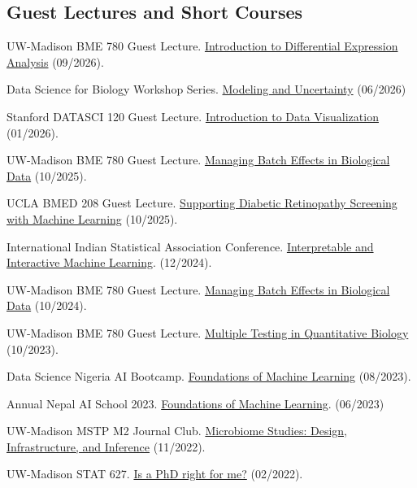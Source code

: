 \documentclass[letterpaper]{article}
\renewenvironment{itemize}{
  \begin{list}{}{
    \setlength{\leftmargin}{1.5em}
  }
}{
  \end{list}
}
\begin{document}
\subsection*{Guest Lectures and Short Courses}
\begin{itemize}

\item UW-Madison BME 780 Guest Lecture. \href{https://krisrs1128.github.io/talks/2026/20260923/20260923.html}{Introduction to Differential Expression Analysis} (09/2026).
\item Data Science for Biology Workshop Series. \href{https://krisrs1128.github.io/durban_workshop/notes.html}{Modeling and Uncertainty} (06/2026)
\item Stanford DATASCI 120 Guest Lecture. \href{https://go.wisc.edu/5fia0y}{Introduction to Data Visualization} (01/2026).
\item UW-Madison BME 780 Guest Lecture. \href{https://krisrs1128.github.io/talks/2025/20251008/20251008.html#1}{Managing Batch Effects in Biological Data} (10/2025).
\item UCLA BMED 208 Guest Lecture. \href{https://go.wisc.edu/32rv90}{Supporting Diabetic Retinopathy Screening with Machine Learning} (10/2025).
\item International Indian Statistical Association Conference. \href{https://docs.google.com/document/u/1/d/1IIu7lEmvBSqQhB5hQQrmus7JN-g-rCS6_HNcNcphlq8/edit?tab=t.0}{Interpretable and Interactive Machine Learning}. (12/2024).
\item UW-Madison BME 780 Guest Lecture. \href{https://krisrs1128.github.io/talks/2024/20241023/20241023.html#1}{Managing Batch Effects in Biological Data} (10/2024).
\item UW-Madison BME 780 Guest Lecture. \href{https://krisrs1128.github.io/talks/2023/20231010/20231010.html}{Multiple Testing in Quantitative Biology} (10/2023).
\item Data Science Nigeria AI Bootcamp. \href{http://krisrs1128.github.io/dsn_foundations_2023}{Foundations of Machine Learning} (08/2023).
\item Annual Nepal AI School 2023. \href{http://krisrs1128.github.io/naamii_summer_2023}{Foundations of Machine Learning}. (06/2023)
\item UW-Madison MSTP M2 Journal Club. \href{https://krisrs1128.github.io/talks/2022/20221128/20221128.html}{Microbiome Studies: Design, Infrastructure, and Inference} (11/2022).
\item UW-Madison STAT 627. \href{https://drive.google.com/file/d/1kq0xJ3XS98igzxFcJOTFUEz2DtoRByCg/view?usp=sharing}{Is a PhD right for me?} (02/2022).

\end{itemize}
\end{document}

